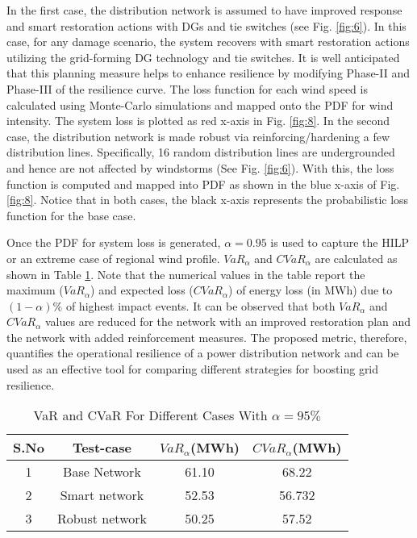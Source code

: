 \documentclass[12pt]{article}
\begin{document}
 
 In the first case, the distribution network is assumed to have improved response and smart restoration actions with DGs and tie switches (see Fig. \ref{fig:6}). In this case, for any damage scenario, the system recovers with smart restoration actions utilizing the grid-forming DG technology and tie switches. It is well anticipated that this planning measure helps to enhance resilience by modifying Phase-II and Phase-III of the resilience curve. The loss function for each wind speed is calculated using Monte-Carlo simulations and mapped onto the PDF for wind intensity. The system loss is plotted as red x-axis in Fig. \ref{fig:8}. In the second case, the distribution network is made robust via reinforcing/hardening a few distribution lines. Specifically, 16 random distribution lines are undergrounded and hence are not affected by windstorms (See Fig. \ref{fig:6}). With this, the loss function is computed and mapped into PDF as shown in the blue x-axis of Fig. \ref{fig:8}. Notice that in both cases, the black x-axis represents the probabilistic loss function for the base case. 
 
 
 
  Once the PDF for system loss is generated, $\alpha=0.95$ is used to capture the HILP or an extreme case of regional wind profile. $VaR_{\alpha}$ and $CVaR_{\alpha}$ are calculated as shown in Table \ref{table:4}. Note that the numerical values in the table report the maximum ($VaR_{\alpha}$) and expected loss ($CVaR_{\alpha}$) of energy loss (in MWh) due to $(1-\alpha)\%$ of highest impact events. It can be observed that both $VaR_{\alpha}$ and $CVaR_{\alpha}$ values are reduced for the network with an improved restoration plan and the network with added reinforcement measures. The proposed metric, therefore, quantifies the operational resilience of a power distribution network and can be used as an effective tool for comparing different strategies for boosting grid resilience.
  
  
  


    \begin{table}[t]
     \vspace{-0.15 cm}
        \centering
        \caption{VaR and CVaR For Different Cases With $\alpha =95\%$}
                \vspace{-0.3cm}
        \label{table:4}
        \begin{tabular}{cccc}
         \toprule[0.3 mm]
            S.No&Test-case&$VaR_{\alpha}$(MWh)&$CVaR_{\alpha}$(MWh)\\
            \hline
            1&Base Network &61.10&68.22 \\
            \hline
            2&Smart network &52.53&56.732 \\
            \hline
            3&Robust network & 50.25&57.52 \\
            \toprule[0.3 mm]
        \end{tabular}
        \vspace{-0.4cm}
    \end{table}
\end{document}
